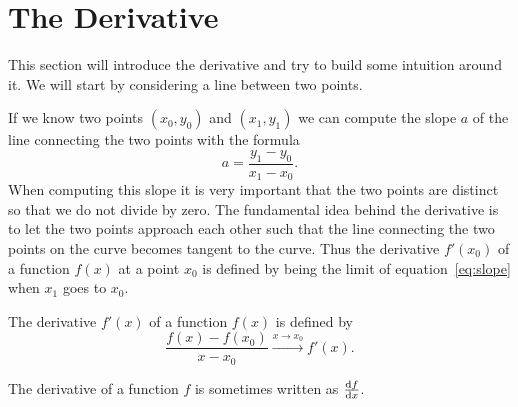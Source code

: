 \documentclass[main.tex]{subfiles}
\begin{document}
\section{The Derivative}
This section will introduce the derivative and try to build some intuition around it. We will start by considering a line between two points.
\begin{wrapfigure}{r}{0.4\linewidth}
\begin{center}
\end{center}
\end{wrapfigure}
If we know two points $(x_0, y_0)$ and $(x_1, y_1)$ we can compute the slope $a$ of the line connecting the two points with the formula
\begin{equation}
a = \frac{y_1 - y_0}{x_1 - x_0}. \label{eq:slope}
\end{equation}
When computing this slope it is very important that the two points are distinct so that we do not divide by zero. The fundamental idea behind the derivative is to let the two points approach each other such that the line connecting the two points on the curve becomes tangent to the curve. Thus the derivative $f'(x_0)$ of a function $f(x)$ at a point $x_0$ is defined by being the limit of equation~\eqref{eq:slope} when $x_1$ goes to $x_0$.
\begin{definition}
The derivative $f'(x)$ of a function $f(x)$ is defined by
\begin{equation}
\frac{f(x) - f(x_0)}{x - x_0} \xrightarrow{x \to x_0} f'(x).
\end{equation}
\end{definition}
The derivative of a function $f$ is sometimes written as $\frac{\text{d} f}{\text{d} x}$.
\end{document}
